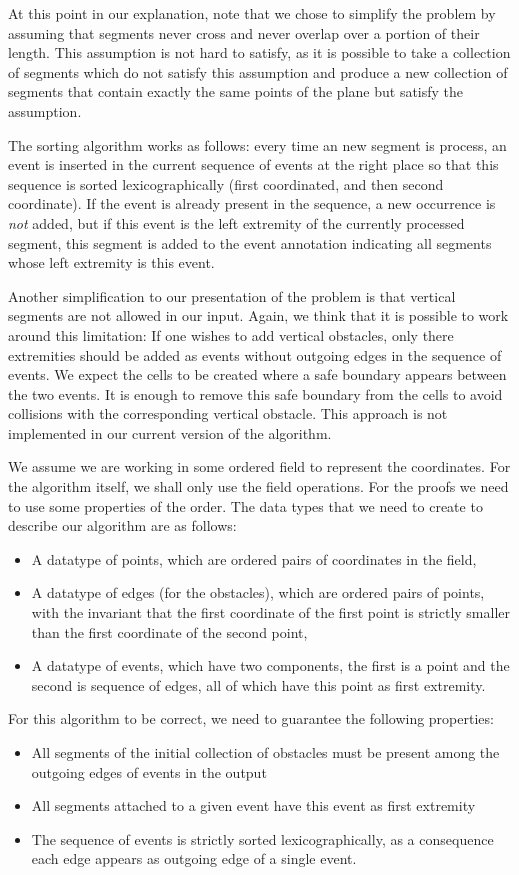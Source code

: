\documentclass{easychair}
\begin{document}
At this point in our explanation, note that we chose to
simplify the problem by assuming that segments never cross and never
overlap over a portion of their length.  This assumption is not hard
to satisfy, as it is possible to take a collection of segments which
do not satisfy this assumption and produce a new collection of
segments that contain exactly the same points of the plane but satisfy
the assumption.

The sorting algorithm works as follows: every time an new segment is
process, an event is inserted in the current sequence of events at the
right place so that this sequence is sorted lexicographically (first
coordinated, and then second coordinate).  If the event is already
present in the sequence, a new occurrence is {\em not} added, but if
this event is the left extremity of the currently processed
segment, this segment is added to the event annotation indicating all
segments whose left extremity is this event.

Another simplification to our presentation of the problem is that
vertical segments are not allowed in our input.  Again, we think that
it is possible to work around this limitation: If one wishes to add
vertical obstacles, only there extremities should be added as events
without outgoing edges in the sequence of events.  We expect the
cells to be created where a safe boundary appears between the two
events.  It is enough to remove this safe boundary from the cells to
avoid collisions with the corresponding vertical obstacle.  This
approach is not implemented in our current version of the algorithm.

We assume we are working in some ordered field to represent the
coordinates.  For the algorithm itself, we shall only use the field
operations.  For the proofs we need to use some properties of the order.
The data types that we need to create to describe our algorithm are as
follows:
\begin{itemize}
\item A datatype of points, which are ordered pairs of coordinates in the field,
\item A datatype of edges (for the obstacles), which are ordered pairs of
  points, with the invariant that the first coordinate of the first
  point is strictly smaller than the first coordinate of the second point,
\item A datatype of events, which have two components, the first is a
  point and the second is sequence of edges, all of which have this
  point as first extremity.
\end{itemize}
For this algorithm to be correct, we need to guarantee the following
properties:
\begin{itemize}
\item All segments of the initial collection of obstacles must be
  present among the outgoing edges of events in the output
\item All segments attached to a given event have this event as first
  extremity
\item The sequence of events is strictly sorted lexicographically, as
  a consequence each edge appears as outgoing edge of a single event.
\end{itemize}
\end{document}
